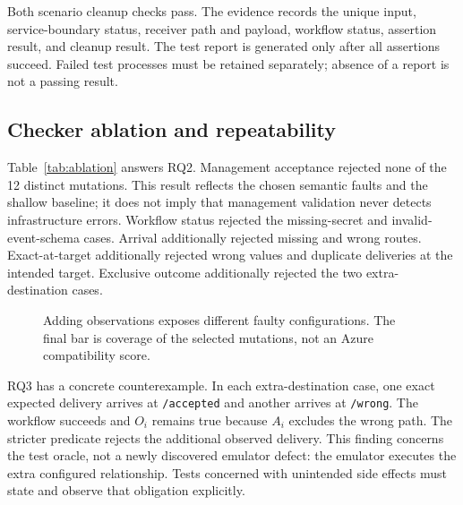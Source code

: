 \documentclass[10pt,a4paper]{article}
\begin{document}
Both scenario cleanup checks pass. The evidence records the unique input, service-boundary status, receiver path and payload, workflow status, assertion result, and cleanup result. The test report is generated only after all assertions succeed. Failed test processes must be retained separately; absence of a report is not a passing result.

\subsection{Checker ablation and repeatability}
Table~\ref{tab:ablation} answers RQ2. Management acceptance rejected none of the 12 distinct mutations. This result reflects the chosen semantic faults and the shallow baseline; it does not imply that management validation never detects infrastructure errors. Workflow status rejected the missing-secret and invalid-event-schema cases. Arrival additionally rejected missing and wrong routes. Exact-at-target additionally rejected wrong values and duplicate deliveries at the intended target. Exclusive outcome additionally rejected the two extra-destination cases.

\begin{table}[ht]
\centering\small
\caption{Rejected faulty episodes and rejected positive controls. Distinct faults count the 12 configurations once; repetitions do not add independent faults.}\label{tab:ablation}

\end{table}

\begin{figure}[ht]
\centering
{}
\caption{Adding observations exposes different faulty configurations. The final bar is coverage of the selected mutations, not an Azure compatibility score.}
\end{figure}

RQ3 has a concrete counterexample. In each extra-destination case, one exact expected delivery arrives at \texttt{/accepted} and another arrives at \texttt{/wrong}. The workflow succeeds and $O_i$ remains true because $A_i$ excludes the wrong path. The stricter predicate rejects the additional observed delivery. This finding concerns the test oracle, not a newly discovered emulator defect: the emulator executes the extra configured relationship. Tests concerned with unintended side effects must state and observe that obligation explicitly.
\end{document}

